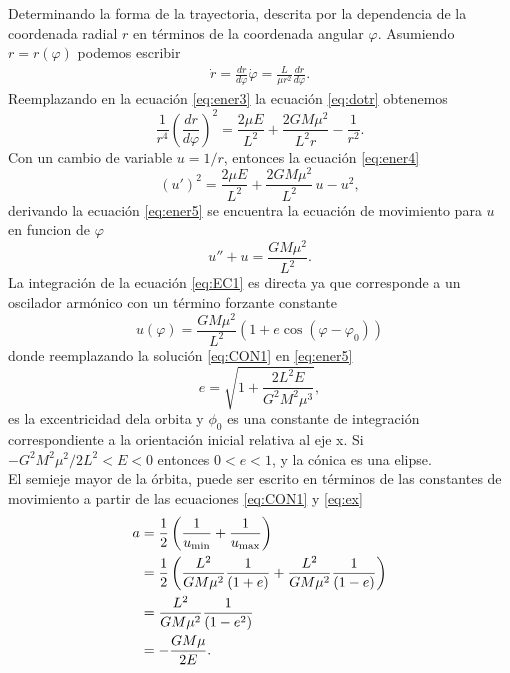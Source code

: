 Determinando la forma de la trayectoria, descrita por la dependencia de la coordenada radial $r$ en términos de la coordenada angular $\varphi$. Asumiendo $r=r(\varphi)$ podemos escribir
\begin{eqnarray}
    \dot{r}=\frac{dr}{d\varphi}\dot{\varphi}=\frac{L}{\mu r^2}\frac{dr}{d\varphi}.
    \label{eq:dotr}
\end{eqnarray}
Reemplazando en la ecuación \ref{eq:ener3} la ecuación \ref{eq:dotr} obtenemos
\begin{equation}
    \frac{1}{r^4}\left(\frac{dr}{d\varphi}\right)^2=\frac{2\mu E}{L^2}+\frac{2GM\mu^2}{L^2r}-\frac{1}{r^2}.\label{eq:ener4}
\end{equation}
Con un cambio de variable $u=1/r$, entonces la ecuación \ref{eq:ener4}
\begin{equation}
    (u')^2=\frac{2\mu E}{L^2}+\frac{2GM\mu^2}{L^2}\,u-u^{2
    },\label{eq:ener5}
    \end{equation}
derivando la ecuación \ref{eq:ener5} se encuentra la ecuación de movimiento para $u$ en funcion de $\varphi$
\begin{equation}
    u''+u=\frac{GM\mu^2}{L^2}.\label{eq:EC1}
\end{equation}
La integración de la ecuación \ref{eq:EC1} es directa ya que corresponde a un oscilador armónico con un término forzante constante
\begin{equation}
    u(\varphi)=\frac{GM\mu^2}{L^2}\left(1+e\cos
    (\varphi-\varphi_0)\right)\label{eq:CON1}
\end{equation}
donde reemplazando la solución \ref{eq:CON1} en \ref{eq:ener5}
\begin{equation}
    e=\sqrt{1+\frac{2L^2E}{G^2M^2\mu^3}}, \label{eq:ex}
\end{equation}
es la excentricidad dela orbita y $\phi_0$ es una constante de integración correspondiente a la orientación inicial relativa al eje x.
Si $-G^2M^2\mu^2/2L^2<E<0$ entonces $0<e<1$, y la cónica es una elipse.\\
El semieje mayor de la órbita, puede ser escrito en términos de las constantes de movimiento a partir de las ecuaciones \ref{eq:CON1} y \ref{eq:ex}
\begin{align*}
    a & = \frac{1}{2}\left(\frac{1}{u_{\rm min}}+\frac{1}{u_{\rm max}}\right) \\
    & = \frac{1}{2}\left(\frac{L^2}{GM\mu^2}\frac{1}{(1+e)}+\frac{L^2}{GM\mu^2}\frac{1}{(1-e)}\right) \\
    & = \frac{L^2}{GM\mu^2}\frac{1}{(1-e^2)} \\
    & = -\frac{GM\mu}{2E}.
    \end{align*}
